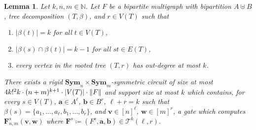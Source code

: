 \documentclass[10pt,a4paper]{article}
\theoremstyle{definition}
\theoremstyle{plain}
\newtheorem{lemma}[definition]{Lemma}
\theoremstyle{remark}
\DeclarePairedDelimiter{\norm}{\lVert}{\rVert}
\DeclarePairedDelimiter{\abs}{\lvert}{\rvert}
\newcommand{\Sym}{\mathbf{Sym}}
\begin{document}
 	\begin{lemma} \label{lem:hom-circuit-core-bipartite}
 		Let $k, n, m \in \mathbb{N}$.
 		Let $F$ be a bipartite multigraph with bipartition $A \uplus B$, tree decomposition $(T, \beta)$, and $r \in V(T)$ such that 
 		\begin{enumerate}
 			\item $|\beta(t)| = k$ for all $t \in V(T)$,
 			\item $|\beta(s) \cap \beta(t)| = k-1$ for all $st \in E(T)$, 
			\item every vertex in the rooted tree $(T,r)$ has out-degree at most $k$.
 		\end{enumerate}
 		There exists a rigid $\Sym_n \times \Sym_m$-symmetric circuit of size at most $4  k!^2 k \cdot (n+m)^{k+1} \cdot \abs{V(T)} \cdot \norm{F} $
 		and support size at most $k$
 		which contains, for every 
 		$s \in V(T)$,
 		$\boldsymbol{a} \in A^\ell$,
 		$\boldsymbol{b} \in B^r$,
 		$\ell +r = k$ such that
 		$\beta(s) = \{a_1, \dots, a_\ell, b_1, \dots, b_r\}$, and $\boldsymbol{v} \in [n]^\ell$,
 		$\boldsymbol{w} \in [m]^r$,
 		a gate which computes $\boldsymbol{F}^s_{n,m}(\boldsymbol{v}, \boldsymbol{w})$
 		where $\boldsymbol{F}^s \coloneqq (F^s, \boldsymbol{a}, \boldsymbol{b}) \in \mathcal{T}^{k}(\ell, r)$.
 	\end{lemma}
\end{document}
